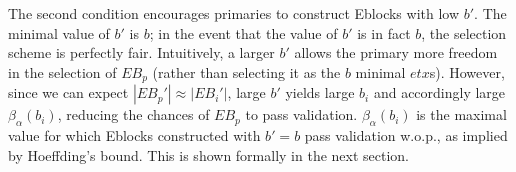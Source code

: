 \noindent The second condition encourages primaries to construct Eblocks with low $b'$. The minimal value of $b'$ is $b$; in the event that the value of $b'$ is in fact $b$, the selection scheme is perfectly fair. Intuitively, a larger $b'$ allows the primary more freedom in the selection of $EB_p$ (rather than selecting it as the $b$ minimal $etx$s). However, since we can expect $|EB_p'| \approx  |EB_i'|$, large $b'$ yields large $b_i$ and accordingly large $\beta_\alpha(b_i)$, reducing the chances of $EB_p$ to pass validation. $\beta_\alpha(b_i)$ is the maximal value for which Eblocks constructed with $b'=b$ pass validation w.o.p., as implied by Hoeffding's bound. This is shown formally in the next section.






